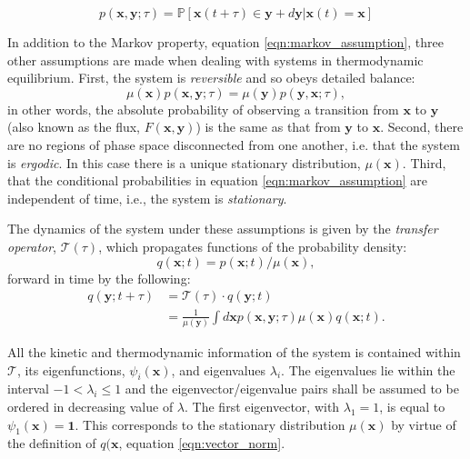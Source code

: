 \begin{equation}\label{eqn:markov_assumption}
p(\mathbf{x}, \mathbf{y} ; \tau)=\mathbb{P}[\mathbf{x}(t+\tau) \in \mathbf{y}+d \mathbf{y} | \mathbf{x}(t)=\mathbf{x}]
\end{equation}

In addition to the Markov property, equation \ref{eqn:markov_assumption}, three other assumptions are made when dealing with systems in thermodynamic equilibrium. First, the system is \emph{reversible} and so obeys detailed balance: 
\begin{equation}\label{eqn:detailed_balance}
\mu(\mathbf{x}) p(\mathbf{x}, \mathbf{y} ; \tau)=\mu(\mathbf{y}) p(\mathbf{y}, \mathbf{x} ; \tau), 
\end{equation}
in other words, the absolute probability of observing a transition from $\mathbf{x}$ to $\mathbf{y}$ (also known as the flux, $F(\mathbf{x}, \mathbf{y})$) is the same as that from $\mathbf{y}$ to $\mathbf{x}$. Second, there are no regions of phase space disconnected from one another, i.e. that the system is \emph{ergodic}. In this case there is a unique stationary distribution,  $\mu(\mathbf{x})$. Third, that the conditional probabilities in equation \ref{eqn:markov_assumption} are independent of time, i.e., the system is \emph{stationary}. 

The dynamics of the system under these assumptions is given by the \emph{transfer operator}, $\mathcal{T}(\tau)$, which propagates functions of the probability density: 
\begin{equation}\label{eqn:vector_norm}
    q(\mathbf{x} ; t) = p(\mathbf{x} ; t)/\mu(\mathbf{x}),
\end{equation}
forward in time by the following: 
\begin{equation}\label{eqn:transfer_operator}
\begin{split}
   q(\mathbf{y} ; t+\tau) &= \mathcal{T}(\tau) \cdot q(\mathbf{y} ; t) \\
   &=\frac{1}{\mu(\mathbf{y})} \int d \mathbf{x} p(\mathbf{x}, \mathbf{y} ; \tau) \mu(\mathbf{x}) q(\mathbf{x} ; t). 
\end{split}
\end{equation}

All the kinetic and thermodynamic information of the system is contained within $\mathcal{T}$, its eigenfunctions, $\psi_{i}(\mathbf{x})$, and eigenvalues $\lambda_{i}$. The eigenvalues lie within the interval $-1 < \lambda_i \le 1$ and the eigenvector/eigenvalue pairs shall be assumed to be ordered in decreasing value of $\lambda$. The first eigenvector, with $\lambda_{1}=1$, is equal to $\psi_{1}(\mathbf{x})=\mathbf{1}$. This corresponds to the stationary distribution $\mu(\mathbf{x})$ by virtue of the definition of $q(\mathbf{x}$, equation \ref{eqn:vector_norm}. 

